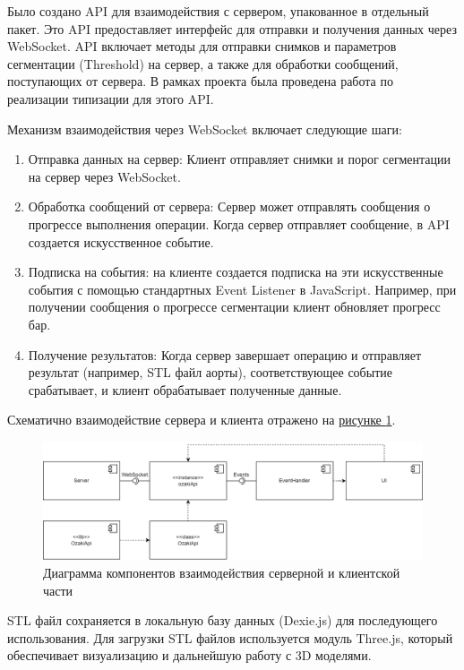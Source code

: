 Было создано API для взаимодействия с сервером, упакованное в отдельный пакет. Это API предоставляет интерфейс для отправки и получения данных через WebSocket. API включает методы для отправки снимков и параметров сегментации (Threshold) на сервер, а также для обработки сообщений, поступающих от сервера. В рамках проекта была проведена работа по реализации типизации для этого API.

Механизм взаимодействия через WebSocket включает следующие шаги:

\begin{enumerate}
    \item Отправка данных на сервер: Клиент отправляет снимки и порог сегментации на сервер через WebSocket.
    \item Обработка сообщений от сервера: Сервер может отправлять сообщения о прогрессе выполнения операции. Когда сервер отправляет сообщение, в API создается искусственное событие.
    \item Подписка на события: на клиенте создается подписка на эти искусственные события с помощью стандартных Event Listener в JavaScript. Например, при получении сообщения о прогрессе сегментации клиент обновляет прогресс бар.
    \item Получение результатов: Когда сервер завершает операцию и отправляет результат (например, STL файл аорты), соответствующее событие срабатывает, и клиент обрабатывает полученные данные.
\end{enumerate}

Схематично взаимодействие сервера и клиента отражено на \hyperref[fig:ws]{рисунке \ref*{fig:ws}}.

\begin{figure}[ht]
    \centering
    \includegraphics[]{images/chap3/ws_components.drawio.png}
    \caption{Диаграмма компонентов взаимодействия серверной и клиентской части}
    \label{fig:ws}
\end{figure}

STL файл сохраняется в локальную базу данных (Dexie.js) для последующего использования. Для загрузки STL файлов используется модуль Three.js, который обеспечивает визуализацию и дальнейшую работу с 3D моделями.

